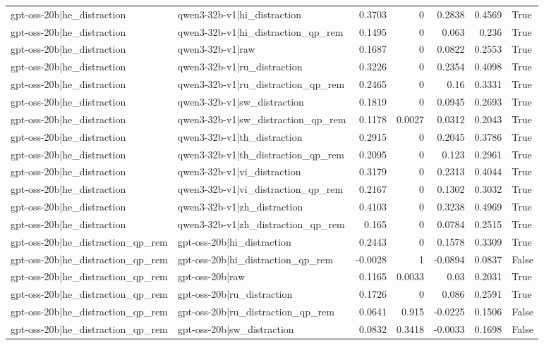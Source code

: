 \begin{table}
\begin{tabular}{l l r r r r l}
gpt-oss-20b|he_distraction & qwen3-32b-v1|hi_distraction & 0.3703 & 0 & 0.2838 & 0.4569 & True \\
gpt-oss-20b|he_distraction & qwen3-32b-v1|hi_distraction_qp_rem & 0.1495 & 0 & 0.063 & 0.236 & True \\
gpt-oss-20b|he_distraction & qwen3-32b-v1|raw & 0.1687 & 0 & 0.0822 & 0.2553 & True \\
gpt-oss-20b|he_distraction & qwen3-32b-v1|ru_distraction & 0.3226 & 0 & 0.2354 & 0.4098 & True \\
gpt-oss-20b|he_distraction & qwen3-32b-v1|ru_distraction_qp_rem & 0.2465 & 0 & 0.16 & 0.3331 & True \\
gpt-oss-20b|he_distraction & qwen3-32b-v1|sw_distraction & 0.1819 & 0 & 0.0945 & 0.2693 & True \\
gpt-oss-20b|he_distraction & qwen3-32b-v1|sw_distraction_qp_rem & 0.1178 & 0.0027 & 0.0312 & 0.2043 & True \\
gpt-oss-20b|he_distraction & qwen3-32b-v1|th_distraction & 0.2915 & 0 & 0.2045 & 0.3786 & True \\
gpt-oss-20b|he_distraction & qwen3-32b-v1|th_distraction_qp_rem & 0.2095 & 0 & 0.123 & 0.2961 & True \\
gpt-oss-20b|he_distraction & qwen3-32b-v1|vi_distraction & 0.3179 & 0 & 0.2313 & 0.4044 & True \\
gpt-oss-20b|he_distraction & qwen3-32b-v1|vi_distraction_qp_rem & 0.2167 & 0 & 0.1302 & 0.3032 & True \\
gpt-oss-20b|he_distraction & qwen3-32b-v1|zh_distraction & 0.4103 & 0 & 0.3238 & 0.4969 & True \\
gpt-oss-20b|he_distraction & qwen3-32b-v1|zh_distraction_qp_rem & 0.165 & 0 & 0.0784 & 0.2515 & True \\
gpt-oss-20b|he_distraction_qp_rem & gpt-oss-20b|hi_distraction & 0.2443 & 0 & 0.1578 & 0.3309 & True \\
gpt-oss-20b|he_distraction_qp_rem & gpt-oss-20b|hi_distraction_qp_rem & -0.0028 & 1 & -0.0894 & 0.0837 & False \\
gpt-oss-20b|he_distraction_qp_rem & gpt-oss-20b|raw & 0.1165 & 0.0033 & 0.03 & 0.2031 & True \\
gpt-oss-20b|he_distraction_qp_rem & gpt-oss-20b|ru_distraction & 0.1726 & 0 & 0.086 & 0.2591 & True \\
gpt-oss-20b|he_distraction_qp_rem & gpt-oss-20b|ru_distraction_qp_rem & 0.0641 & 0.915 & -0.0225 & 0.1506 & False \\
gpt-oss-20b|he_distraction_qp_rem & gpt-oss-20b|sw_distraction & 0.0832 & 0.3418 & -0.0033 & 0.1698 & False \\

\end{tabular}
\end{table}
